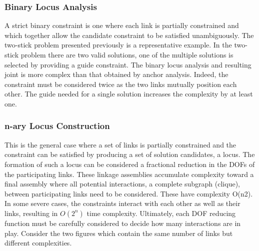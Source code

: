\documentclass[]{report}
\begin{document}

\subsubsection{Binary Locus Analysis}

A strict binary constraint is one where each link is 
partially constrained and which together allow the candidate constraint to be satisfied unambiguously. 
The two-stick problem presented previously is a representative example. 
In the two-stick problem there are two valid solutions, 
one of the multiple solutions is selected by providing a guide constraint. 
The binary locus analysis and resulting joint is 
more complex than that obtained by anchor analysis. 
Indeed, the constraint must be considered twice as the two links mutually position each other. 
The guide needed for a single solution increases the complexity by at least one.

\subsubsection{n-ary Locus Construction}

This is the general case where a set of links is partially 
constrained and the constraint can be satisfied by producing a set of solution candidates, a locus. 
The formation of such a locus can be considered a 
fractional reduction in the DOFs of the participating links. 
These linkage assemblies accumulate complexity toward 
a final assembly where all potential interactions, 
a complete subgraph (clique), between participating links need to be considered. 
These have complexity O(n2). In some severe cases, 
the constraints interact with each other as well as their links, 
resulting in $O(2^n)$ time complexity. 
Ultimately, each DOF reducing function must be carefully 
considered to decide how many interactions are in play. 
Consider the two figures which contain the same number of links but different complexities.
\end{document}
